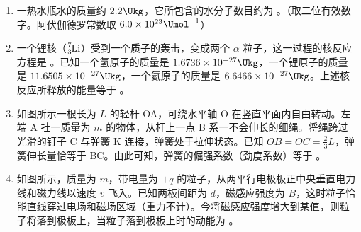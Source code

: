 \documentclass[\gkver]{gaokaozhenti}
\begin{document}
\begin{enumerate}
\item
一热水瓶水的质量约 $2.2\Ukg$，它所包含的水分子数目约为 。（取二位有效数字。阿伏伽德罗常数取 $6.0\times10^{23}\Umol^{-1}$）

\item
一个锂核（$\ce{^{7}_{3}Li}$）受到一个质子的轰击，变成两个 $\alpha$ 粒子，这一过程的核反应方程是 。已知一个氢原子的质量是 $1.6736\times10^{-27}\Ukg$，一个锂原子的质量是 $11.6505\times10^{-27}\Ukg$，一个氦原子的质量是 $6.6466\times10^{-27}\Ukg$。上述核反应所释放的能量等于 。

\item
如图所示一根长为 $L$ 的轻杆 OA，可绕水平轴 O 在竖直平面内自由转动。左端 A 挂一质量为 $m$ 的物体，从杆上一点 B 系一不会伸长的细绳。将绳跨过光滑的钉子 C 与弹簧 K 连接，弹簧处于拉伸状态。已知 $OB = OC = \frac{2}{3}L$，弹簧伸长量恰等于 BC。由此可知，弹簧的倔强系数（劲度系数）等于 。
\onepicture[align=right, w=7cm]{}

\item
如图所示，质量为 $m$，带电量为 $+q$ 的粒子，从两平行电极板正中央垂直电力线和磁力线以速度 $v$ 飞入。已知两板间距为 $d$，磁感应强度为 $B$，这时粒子恰能直线穿过电场和磁场区域（重力不计）。今将磁感应强度增大到某值，则粒子将落到极板上，当粒子落到极板上时的动能为 。
\onepicture[align=right, w=7cm]{}


\end{enumerate}
\end{document}
